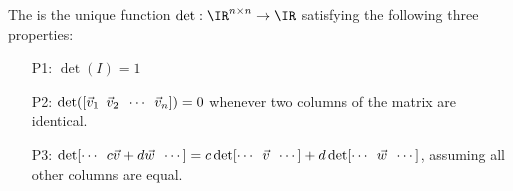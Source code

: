 \begin{applicationActivities}{1}{25}
\begin{definition}
The  is the unique function
\(\det:\IR^{n\times n}\to\IR\) satisfying the following three properties:
\begin{enumerate}
\item [P1:] $\det(I)=1$
\item [P2:] $\det([\vec{v}_1\hspace{0.5em}\vec{v}_2\hspace{0.5em}
\cdots\hspace{0.5em}\vec{v}_n])=0$ whenever two columns of the matrix are identical.
\item[P3:]
\(\det[\cdots\hspace{0.5em}c\vec{v}+d\vec{w}\hspace{0.5em}\cdots]=
c\det[\cdots\hspace{0.5em}\vec{v}\hspace{0.5em}\cdots]+
d\det[\cdots\hspace{0.5em}\vec{w}\hspace{0.5em}\cdots]\), assuming
all other columns are equal.
\end{enumerate}
\end{definition}

%


\end{applicationActivities}

